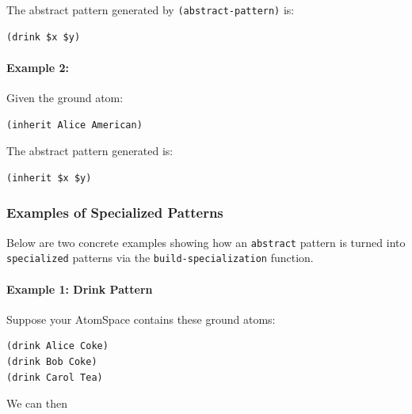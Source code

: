 \documentclass{article}
\begin{document}
The abstract pattern generated by \texttt{(abstract-pattern)} is:

\begin{verbatim}
(drink $x $y)
\end{verbatim}

\paragraph{Example 2:}

Given the ground atom:

\begin{verbatim}
(inherit Alice American)
\end{verbatim}

The abstract pattern generated is:

\begin{verbatim}
(inherit $x $y)
\end{verbatim}


\subsubsection{Examples of Specialized Patterns}

Below are two concrete examples showing how an \texttt{abstract} pattern is turned into \texttt{specialized} patterns via the \texttt{build-specialization} function.

\paragraph{Example 1: Drink Pattern}

Suppose your AtomSpace contains these ground atoms:

\begin{verbatim}
(drink Alice Coke)
(drink Bob Coke)
(drink Carol Tea)
\end{verbatim}

We can then
\end{document}

